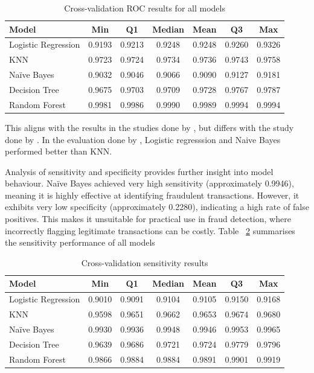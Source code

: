 \documentclass{article}
\begin{document}
\begin{table}[htbp]
\centering
\begin{tabular}{lcccccc}
\hline
Model & Min & Q1 & Median & Mean & Q3 & Max \\
\hline
Logistic Regression & 0.9193 & 0.9213 & 0.9248 & 0.9248 & 0.9260 & 0.9326 \\
KNN                 & 0.9723 & 0.9724 & 0.9734 & 0.9736 & 0.9743 & 0.9758 \\
Naïve Bayes         & 0.9032 & 0.9046 & 0.9066 & 0.9090 & 0.9127 & 0.9181 \\
Decision Tree       & 0.9675 & 0.9703 & 0.9709 & 0.9728 & 0.9767 & 0.9787 \\
Random Forest       & 0.9981 & 0.9986 & 0.9990 & 0.9989 & 0.9994 & 0.9994 \\
\hline
\end{tabular}
\caption{Cross-validation ROC results for all models}
\label{tab:roc_cv}
\end{table}

This aligns with the results in the studies done by \citet{khare2018}, but differs with the study done by \citet{Itoo2020}. In the evaluation done by \citet{Itoo2020}, Logistic regresssion and Naive Bayes performed better than KNN.


Analysis of sensitivity and specificity provides further insight into model behaviour. Naïve Bayes achieved very high sensitivity (approximately 0.9946), meaning it is highly effective at identifying fraudulent transactions. However, it exhibits very low specificity (approximately 0.2280), indicating a high rate of false positives. This makes it unsuitable for practical use in fraud detection, where incorrectly flagging legitimate transactions can be costly. Table ~\ref{tab:sens_cv} summarises the sensitivity performance of all models 

\begin{table}[htbp]
\centering
\begin{tabular}{lcccccc}
\hline
Model & Min & Q1 & Median & Mean & Q3 & Max \\
\hline
Logistic Regression & 0.9010 & 0.9091 & 0.9104 & 0.9105 & 0.9150 & 0.9168 \\
KNN                 & 0.9598 & 0.9651 & 0.9662 & 0.9653 & 0.9674 & 0.9680 \\
Naïve Bayes         & 0.9930 & 0.9936 & 0.9948 & 0.9946 & 0.9953 & 0.9965 \\
Decision Tree       & 0.9639 & 0.9686 & 0.9721 & 0.9724 & 0.9779 & 0.9796 \\
Random Forest       & 0.9866 & 0.9884 & 0.9884 & 0.9891 & 0.9901 & 0.9919 \\
\hline
\end{tabular}
\caption{Cross-validation sensitivity results}
\label{tab:sens_cv}
\end{table}
\end{document}
